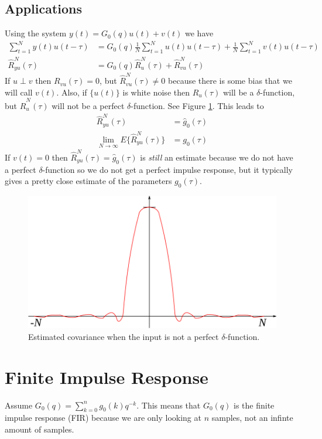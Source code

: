 \documentclass[lecture,12pt,]{pcms-l}
\theoremstyle{example}
\newcommand{\ruhat}{\hat{R}_u^N(\tau)}
\newcommand{\ryuhat}{\hat{R}_{yu}^N(\tau)}
\begin{document}
\subsection{Applications}
Using the system $y(t) = G_0(q)u(t)+v(t)$ we have
\begin{align*}
\sum_{t=1}^Ny(t)u(t-\tau) &= G_0(q)\frac{1}{N}\sum_{t=1}^Nu(t)u(t-\tau) + \frac{1}{N}\sum_{t=1}^Nv(t)u(t-\tau) \\
\ryuhat &= G_0(q)\ruhat + \hat{R}_{vu}^N(\tau)
\end{align*}
If $u\perp v$ then $R_{vu}(\tau)=0$, but $\hat{R}_{vu}^N(\tau)\neq 0$ because there is some bias that we will call $v(t)$. Also, if $\{u(t)\}$ is white noise then $R_u(\tau)$ will be a $\delta$-function, but $\ruhat$ will not be a perfect $\delta$-function. See Figure \ref{fig:05xcov}. This leads to
\begin{align*}
\ryuhat &= \hat{g}_0(\tau) \\
\lim_{N\to\infty}E\{\ryuhat\} &= g_0(\tau)
\end{align*}
If $v(t)=0$ then $\ryuhat=\hat{g}_0(\tau)$ is \textit{still} an estimate because we do not have a perfect $\delta$-function so we do not get a perfect impulse response, but it typically gives a pretty close estimate of the parameters $g_0(\tau)$.
\begin{figure}[ht!]
	\centering
	\includegraphics[width=.5\textwidth]{images/05xcov}
	\caption{Estimated covariance when the input is not a perfect $\delta$-function.}
	\label{fig:05xcov}
\end{figure}

\section{Finite Impulse Response}
Assume $G_0(q) = \sum_{k=0}^ng_0(k)q^{-k}$. This means that $G_0(q)$ is the finite impulse response (FIR) because we are only looking at $n$ samples, not an infinte amount of samples.
\end{document}
